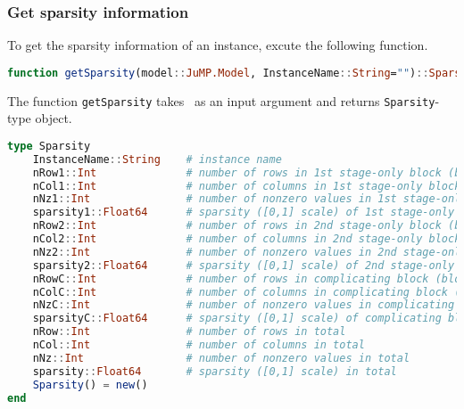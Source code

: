 \subsubsection{Get sparsity information}
To get the sparsity information of an instance, excute the following function.
\begin{lstlisting}[frame=single,language=julia]
function getSparsity(model::JuMP.Model, InstanceName::String="")::Sparsity
\end{lstlisting}
The function \texttt{getSparsity} takes \jumpmodel\ as an input argument and returns \texttt{Sparsity}-type object.
\begin{lstlisting}[frame=single,language=julia]
type Sparsity
	InstanceName::String    # instance name
	nRow1::Int              # number of rows in 1st stage-only block (block A)
	nCol1::Int              # number of columns in 1st stage-only block (block A)
	nNz1::Int               # number of nonzero values in 1st stage-only block (block A)
	sparsity1::Float64      # sparsity ([0,1] scale) of 1st stage-only block (block A)
	nRow2::Int              # number of rows in 2nd stage-only block (block W)
	nCol2::Int              # number of columns in 2nd stage-only block (block W)
	nNz2::Int               # number of nonzero values in 2nd stage-only block (block W)
	sparsity2::Float64      # sparsity ([0,1] scale) of 2nd stage-only block (block W)
	nRowC::Int              # number of rows in complicating block (block T)
	nColC::Int              # number of columns in complicating block (block T)
	nNzC::Int               # number of nonzero values in complicating block (block T)  
	sparsityC::Float64      # sparsity ([0,1] scale) of complicating block (block T)
	nRow::Int               # number of rows in total
	nCol::Int               # number of columns in total
	nNz::Int                # number of nonzero values in total
	sparsity::Float64       # sparsity ([0,1] scale) in total
	Sparsity() = new()
end
\end{lstlisting}
